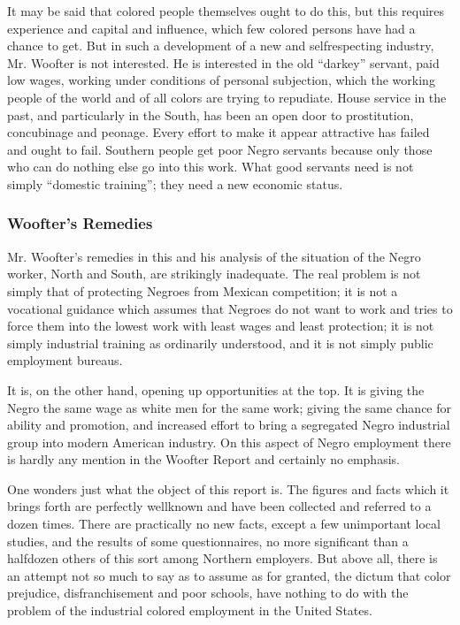 \documentclass[letterpaper,10pt,english]{jupyterBook}
\begin{document}
\sphinxAtStartPar
It may be said that colored people themselves ought to do this, but this requires experience and capital and influence, which few colored persons have had a chance to get. But in such a development of a new and self\sphinxhyphen{}respecting industry, Mr. Woofter is not interested. He is interested in the old “darkey” servant, paid low wages, working under conditions of personal subjection, which the working people of the world and of all colors are trying to repudiate. House service in the past, and particularly in the South, has been an open door to prostitution, concubinage and peonage. Every effort to make it appear attractive has failed and ought to fail. Southern people get poor Negro servants because only those who can do nothing else go into this work. What good servants need is not simply “domestic training”; they need a new economic status.


\subsubsection{Woofter’s Remedies}
\label{\detokenize{Volumes/38/03/woofterism:woofters-remedies}}
\sphinxAtStartPar
Mr. Woofter’s remedies in this and his analysis of the situation of the Negro worker, North and South, are strikingly inadequate. The real problem is not simply that of protecting Negroes from Mexican competition; it is not a vocational guidance which assumes that Negroes do not want to work and tries to force them into the lowest work with least wages and least protection; it is not simply industrial training as ordinarily understood, and it is not simply public employment bureaus.

\sphinxAtStartPar
It is, on the other hand, opening up opportunities at the top. It is giving the Negro the same wage as white men for the same work; giving the same chance for ability and promotion, and increased effort to bring a segregated Negro industrial group into modern American industry. On this aspect of Negro employment there is hardly any mention in the Woofter Report and certainly no emphasis.

\sphinxAtStartPar
One wonders just what the object of this report is. The figures and facts which it brings forth are perfectly well\sphinxhyphen{}known and have been collected and referred to a dozen times. There are practically no new facts, except a few unimportant local studies, and the results of some questionnaires, no more significant than a half\sphinxhyphen{}dozen others of this sort among Northern employers. But above all, there is an attempt not so much to say as to assume as for granted, the dictum that color prejudice, disfranchisement and poor schools, have nothing to do with the problem of the industrial colored employment in the United States.
\end{document}

